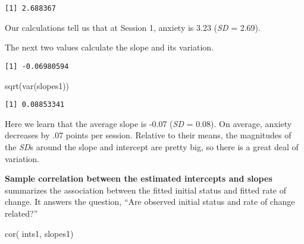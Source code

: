 \documentclass[
  11pt,
]{book}
\newenvironment{Shaded}{\begin{snugshade}}{\end{snugshade}}
\newcommand{\AttributeTok}[1]{\textcolor[rgb]{0.77,0.63,0.00}{#1}}
\newcommand{\CommentTok}[1]{\textcolor[rgb]{0.56,0.35,0.01}{\textit{#1}}}
\newcommand{\ConstantTok}[1]{\textcolor[rgb]{0.00,0.00,0.00}{#1}}
\newcommand{\ControlFlowTok}[1]{\textcolor[rgb]{0.13,0.29,0.53}{\textbf{#1}}}
\newcommand{\DecValTok}[1]{\textcolor[rgb]{0.00,0.00,0.81}{#1}}
\newcommand{\FunctionTok}[1]{\textcolor[rgb]{0.00,0.00,0.00}{#1}}
\newcommand{\NormalTok}[1]{#1}
\newcommand{\OtherTok}[1]{\textcolor[rgb]{0.56,0.35,0.01}{#1}}
\newcommand{\SpecialCharTok}[1]{\textcolor[rgb]{0.00,0.00,0.00}{#1}}
\begin{document}
\begin{verbatim}
[1] 2.688367
\end{verbatim}

Our calculations tell us that at Session 1, anxiety is 3.23 (\emph{SD} = 2.69).

The next two values calculate the slope and its variation.

\begin{Shaded}
\end{Shaded}

\begin{verbatim}
[1] -0.06980594
\end{verbatim}

\begin{Shaded}
\begin{Highlighting}[]
\FunctionTok{sqrt}\NormalTok{(}\FunctionTok{var}\NormalTok{(slopes1))}
\end{Highlighting}
\end{Shaded}

\begin{verbatim}
[1] 0.08853341
\end{verbatim}

Here we learn that the average slope is -0.07 (\emph{SD} = 0.08). On average, anxiety decreases by .07 points per session. Relative to their means, the magnitudes of the \emph{SD}s around the slope and intercept are pretty big, so there is a great deal of variation.

\textbf{Sample correlation between the estimated intercepts and slopes} summarizes the association between the fitted initial status and fitted rate of change. It answers the question, ``Are observed initial status and rate of change related?''

\begin{Shaded}
\begin{Highlighting}[]
\FunctionTok{cor}\NormalTok{( ints1, slopes1)}
\end{Highlighting}
\end{Shaded}
\end{document}
